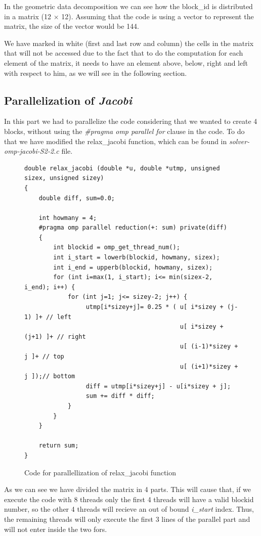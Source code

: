 \documentclass[12pt, a4paper]{article}
\begin{document}
In the geometric data decomposition we can see how the block\_id is distributed in a matrix (12 $\times$ 12). Assuming that the code is using a vector to represent the matrix, the size of the vector would be 144.

We have marked in white (first and last row and column) the cells in the matrix that will not be accessed due to the fact that to do the computation for each element of the matrix, it needs to have an element above, below, right and left with respect to him, as we will see in the following section.

\subsection{Parallelization of \textit{Jacobi}}

In this part we had to parallelize the code considering that we wanted to create 4 blocks, without using the \textit{\#pragma omp parallel for} clause in the code. To do that we have modified the relax\_jacobi function, which can be found in \textit{solver-omp-jacobi-S2-2.c} file.

 \begin{figure}[H]
\begin{lstlisting}
double relax_jacobi (double *u, double *utmp, unsigned sizex, unsigned sizey)
{
	double diff, sum=0.0;

	int howmany = 4;
	#pragma omp parallel reduction(+: sum) private(diff)
	{
		int blockid = omp_get_thread_num();
		int i_start = lowerb(blockid, howmany, sizex);
		int i_end = upperb(blockid, howmany, sizex);
		for (int i=max(1, i_start); i<= min(sizex-2, i_end); i++) {
			for (int j=1; j<= sizey-2; j++) {
				 utmp[i*sizey+j]= 0.25 * ( u[ i*sizey + (j-1) ]+ // left
										   u[ i*sizey + (j+1) ]+ // right
							   			   u[ (i-1)*sizey + j ]+ // top
							               u[ (i+1)*sizey + j ]);// bottom
				 diff = utmp[i*sizey+j] - u[i*sizey + j];
				 sum += diff * diff; 
			}
		}
	}

    return sum;
}
\end{lstlisting}
\caption{Code for parallellization of relax\_jacobi function}
\end{figure}

As we can see we have divided the matrix in 4 parts. This will cause that, if we execute the code with 8 threads only the first 4 threads will have a valid blockid number, so the other 4 threads will recieve an out of bound \textit{i\_start} index. Thus, the remaining threads will only execute the first 3 lines of the parallel part and will not enter inside the two fors.
\end{document}
